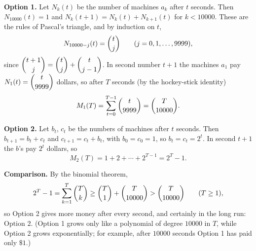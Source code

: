 \textbf{Option 1.} Let $N_k(t)$ be the number of machines $a_k$ after $t$ seconds. Then $N_{10000}(t)=1$ and $N_k(t+1)=N_k(t)+N_{k+1}(t)$ for $k<10000$. These are the rules of Pascal's triangle, and by induction on $t$,
\[N_{10000-j}(t)=\dbinom tj\qquad(j=0,1,\dots,9999),\]
since $\dbinom{t+1}{j}=\dbinom tj+\dbinom t{j-1}$. In second number $t+1$ the machines $a_1$ pay $N_1(t)=\dbinom t{9999}$ dollars, so after $T$ seconds (by the hockey-stick identity)
\[M_1(T)=\sum_{t=0}^{T-1}\dbinom{t}{9999}=\dbinom{T}{10000}.\]

\textbf{Option 2.} Let $b_t$, $c_t$ be the numbers of machines after $t$ seconds. Then $b_{t+1}=b_t+c_t$ and $c_{t+1}=c_t+b_t$, with $b_0=c_0=1$, so $b_t=c_t=2^t$. In second $t+1$ the $b$'s pay $2^t$ dollars, so
\[M_2(T)=1+2+\cdots+2^{T-1}=2^T-1.\]

\textbf{Comparison.} By the binomial theorem,
\[2^T-1=\sum_{k=1}^{T}\dbinom Tk\ge\dbinom T1+\dbinom T{10000}>\dbinom{T}{10000}\qquad(T\ge1),\]
so Option 2 gives more money after every second, and certainly in the long run: $\boxed{\text{Option 2}}$. (Option 1 grows only like a polynomial of degree $10000$ in $T$, while Option 2 grows exponentially; for example, after $10000$ seconds Option 1 has paid only $\$1$.)
